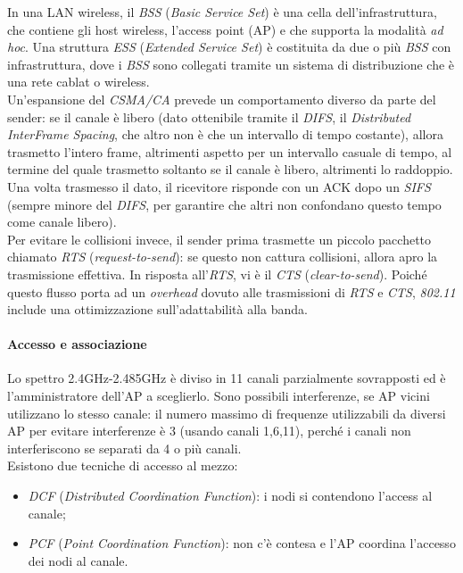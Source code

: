 In una LAN wireless, il \textit{BSS} (\textit{Basic Service Set}) è una cella dell'infrastruttura, che contiene gli host wireless, l'access point (AP) e che supporta la modalità \textit{ad hoc}. Una struttura \textit{ESS} (\textit{Extended Service Set}) è costituita da due o più \textit{BSS} con infrastruttura, dove i \textit{BSS} sono collegati tramite un sistema di distribuzione che è una rete cablat o wireless. \\
Un'espansione del \textit{CSMA/CA} prevede un comportamento diverso da parte del sender: se il canale è libero (dato ottenibile tramite il \textit{DIFS}, il \textit{Distributed InterFrame Spacing}, che altro non è che un intervallo di tempo costante), allora trasmetto l'intero frame, altrimenti aspetto per un intervallo casuale di tempo, al termine del quale trasmetto soltanto se il canale è libero, altrimenti lo raddoppio. Una volta trasmesso il dato, il ricevitore risponde con un ACK dopo un \textit{SIFS} (sempre minore del \textit{DIFS}, per garantire che altri non confondano questo tempo come canale libero). \\
Per evitare le collisioni invece, il sender prima trasmette un piccolo pacchetto chiamato \textit{RTS} (\textit{request-to-send}): se questo non cattura collisioni, allora apro la trasmissione effettiva. In risposta all'\textit{RTS}, vi è il \textit{CTS} (\textit{clear-to-send}).
Poiché questo flusso porta ad un \textit{overhead} dovuto alle trasmissioni di \textit{RTS} e \textit{CTS}, \textit{802.11} include una ottimizzazione sull'adattabilità alla banda.

\paragraph{Accesso e associazione}
Lo spettro 2.4GHz-2.485GHz è diviso in 11 canali parzialmente sovrapposti ed è l'amministratore dell'AP a sceglierlo. Sono possibili interferenze, se AP vicini utilizzano lo stesso canale: il numero massimo di frequenze utilizzabili da diversi AP per evitare interferenze è 3 (usando canali 1,6,11), perché i canali non interferiscono se separati da 4 o più canali. \\
Esistono due tecniche di accesso al mezzo:
\begin{itemize}
	\item \textit{DCF} (\textit{Distributed Coordination Function}): i nodi si contendono l'access al canale;
	\item \textit{\textit{PCF}} (\textit{Point Coordination Function}): non c'è contesa e l'AP coordina l'accesso dei nodi al canale.
\end{itemize}

